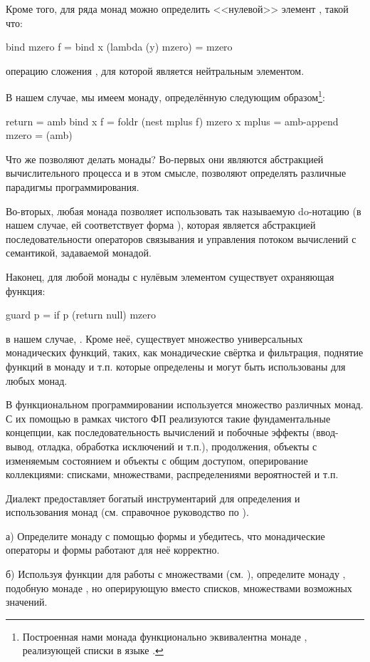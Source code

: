 Кроме того, для ряда монад можно определить <<нулевой>> элемент , такой что:

\begin{SchemeCode}
  bind mzero f = bind x (lambda (y) mzero) = mzero
\end{SchemeCode}
 операцию сложения , для которой  является нейтральным элементом.

В нашем случае, мы имеем монаду, определённую следующим образом\footnote{Построенная нами монада функционально эквивалентна монаде , реализующей списки в языке .}:

\begin{SchemeCode}
  return = amb
  bind x f = foldr (nest mplus f) mzero x
  mplus = amb-append
  mzero = (amb)
\end{SchemeCode}

Что же позволяют делать монады? Во-первых они являются абстракцией вычислительного процесса и в этом смысле, позволяют определять различные парадигмы программирования. 

Во-вторых, любая монада позволяет использовать так называемую do-нотацию (в нашем случае, ей соответствует форма ), которая является абстракцией последовательности операторов связывания и управления потоком вычислений с семантикой, задаваемой монадой.

Наконец, для любой монады с нулёвым элементом существует охраняющая функция:

\begin{SchemeCode}
  guard p = if p (return null) mzero
\end{SchemeCode}
в нашем случае, .
Кроме неё, существует множество универсальных монадических функций, таких, как монадические свёртка и фильтрация, поднятие функций в монаду и т.п. которые определены и могут быть использованы для любых монад.

В функциональном программировании используется множество различных монад. С их помощью в рамках чистого ФП реализуются такие фундаментальные концепции, как последовательность вычислений и побочные эффекты (ввод-вывод, отладка, обработка исключений и т.п.), продолжения, объекты с изменяемым состоянием и объекты с общим доступом, оперирование коллекциями: списками, множествами, распределениями вероятностей и т.п.

\begin{Assignment}
Диалект \FLP предоставляет богатый инструментарий для определения и использования монад (см. справочное руководство по \FLP).

а) Определите монаду  с помощью формы  и убедитесь, что монадические операторы и формы работают для неё корректно.

б) Используя функции для работы с множествами (см. ), определите монаду , подобную монаде , но оперирующую вместо списков, множествами возможных значений. 

\end{Assignment}

